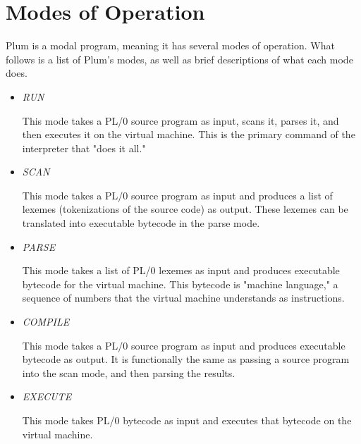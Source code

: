 \documentclass{article}
\begin{document}
\section*{Modes of Operation}
Plum is a modal program, meaning it has several modes of operation. What follows
is a list of Plum's modes, as well as brief descriptions of what each mode does.
\begin{itemize}
    \item \emph{RUN}

        This mode takes a PL/0 source program as input, scans it, parses it, and then
        executes it on the virtual machine. This is the primary command of the interpreter
        that "does it all."

    \item \emph{SCAN}

        This mode takes a PL/0 source program as input and produces a list of lexemes
        (tokenizations of the source code) as output. These lexemes can be translated
        into executable bytecode in the parse mode.

    \item \emph{PARSE}
        
        This mode takes a list of PL/0 lexemes as input and produces executable bytecode
        for the virtual machine. This bytecode is "machine language," a sequence of numbers
        that the virtual machine understands as instructions.

    \item \emph{COMPILE}

        This mode takes a PL/0 source program as input and produces executable bytecode
        as output. It is functionally the same as passing a source program into the scan
        mode, and then parsing the results.

    \item \emph{EXECUTE}

        This mode takes PL/0 bytecode as input and executes that bytecode on the virtual
        machine.
\end{itemize}

\pagebreak
\end{document}
